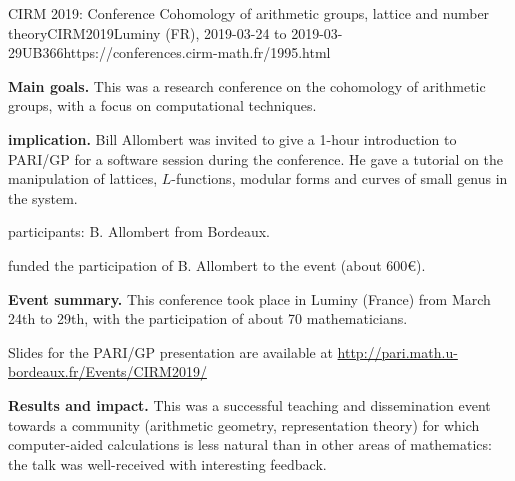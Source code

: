 \begin{event}{CIRM 2019: Conference Cohomology of arithmetic groups, lattice and number
  theory}{CIRM2019}{Luminy (FR),
  2019-03-24 to
  2019-03-29}{UB}{36}{6}{https://conferences.cirm-math.fr/1995.html}
  
\textbf{Main goals.} This was a research conference on the cohomology of
arithmetic groups, with a focus on computational techniques.

\textbf{\ODK implication.} Bill Allombert was invited to give a 1-hour
introduction to PARI/GP for a software session during the conference.
He gave a tutorial on the manipulation of lattices, $L$-functions,
modular forms and curves of small genus in the system.

\ODK participants: B. Allombert from Bordeaux.

\ODK funded the participation of B. Allombert to the event (about 600\euro).

\textbf{Event summary.} This conference took place in Luminy (France)
from March 24th to 29th, with the participation of about 70 mathematicians.

Slides for the PARI/GP presentation are available at
\url{http://pari.math.u-bordeaux.fr/Events/CIRM2019/}

\textbf{Results and impact.} This was a successful teaching and dissemination
event towards a community (arithmetic geometry, representation theory)
for which computer-aided calculations is less natural than in other
areas of mathematics: the talk was well-received with interesting
feedback.
\end{event}
